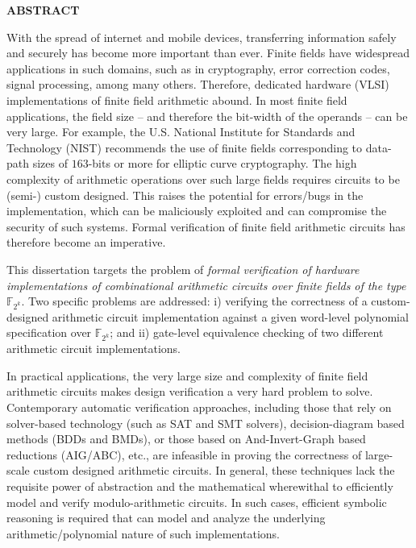 \begin{center}{\bf ABSTRACT}\end{center}

With the spread of internet and mobile devices, transferring
information safely and securely has become more important than ever. 
Finite fields have widespread applications in such domains, such as
in cryptography, error correction codes, signal processing, 
among many others. Therefore, dedicated hardware (VLSI)
implementations of finite field arithmetic abound. In most finite
field applications, the field size  -- and therefore the bit-width of
the operands -- can be very large. For example, the U.S. National
Institute for Standards and Technology (NIST) recommends the use of
finite fields corresponding to data-path sizes of $163$-bits or more
for elliptic curve cryptography.  
The high complexity of arithmetic operations over such large fields
requires circuits to be (semi-) custom designed. This raises the
potential for errors/bugs in the implementation, which can be
maliciously exploited and can compromise the security of such
systems. Formal verification of finite field arithmetic circuits
has therefore become an imperative. 


This dissertation targets the problem of {\it formal verification of 
hardware implementations of combinational arithmetic circuits over
finite fields of the type ${\mathbb{F}}_{2^k}$}. Two specific problems
are addressed: i) verifying the correctness of a custom-designed
arithmetic circuit implementation against a given word-level
polynomial specification over ${\mathbb{F}_{2^k}}$; and ii) gate-level
equivalence checking of two different arithmetic circuit implementations. 

In practical applications, the very large size and complexity of
finite field arithmetic circuits  makes design verification a very
hard problem to solve. Contemporary automatic verification approaches,
including those that rely on solver-based technology (such as SAT and
SMT solvers), decision-diagram based methods (BDDs and BMDs), or those
based on And-Invert-Graph based reductions (AIG/ABC), etc.,
are infeasible in proving the correctness of large-scale custom designed
arithmetic circuits. In general, these techniques lack the requisite
power of abstraction and the mathematical wherewithal to efficiently
model and verify modulo-arithmetic circuits. In such cases, efficient
symbolic reasoning is required that can model and analyze the
underlying arithmetic/polynomial nature of such implementations. 


